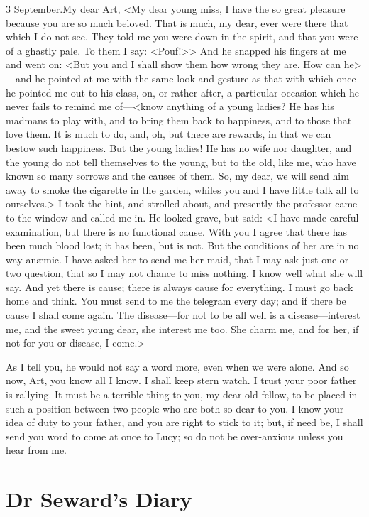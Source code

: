 \begin{mail}{3 September.}{My dear Art,}
<My dear young miss, I have the so great pleasure because you are so much beloved. That is much, my dear, ever were there that which I do not see. They told me you were down in the spirit, and that you were of a ghastly pale. To them I say: <Pouf!>> And he snapped his fingers at me and went on: <But you and I shall show them how wrong they are. How can he>—and he pointed at me with the same look and gesture as that with which once he pointed me out to his class, on, or rather after, a particular occasion which he never fails to remind me of—<know anything of a young ladies? He has his madmans to play with, and to bring them back to happiness, and to those that love them. It is much to do, and, oh, but there are rewards, in that we can bestow such happiness. But the young ladies! He has no wife nor daughter, and the young do not tell themselves to the young, but to the old, like me, who have known so many sorrows and the causes of them. So, my dear, we will send him away to smoke the cigarette in the garden, whiles you and I have little talk all to ourselves.> I took the hint, and strolled about, and presently the professor came to the window and called me in. He looked grave, but said: <I have made careful examination, but there is no functional cause. With you I agree that there has been much blood lost; it has been, but is not. But the conditions of her are in no way anæmic. I have asked her to send me her maid, that I may ask just one or two question, that so I may not chance to miss nothing. I know well what she will say. And yet there is cause; there is always cause for everything. I must go back home and think. You must send to me the telegram every day; and if there be cause I shall come again. The disease—for not to be all well is a disease—interest me, and the sweet young dear, she interest me too. She charm me, and for her, if not for you or disease, I come.>

As I tell you, he would not say a word more, even when we were alone. And so now, Art, you know all I know. I shall keep stern watch. I trust your poor father is rallying. It must be a terrible thing to you, my dear old fellow, to be placed in such a position between two people who are both so dear to you. I know your idea of duty to your father, and you are right to stick to it; but, if need be, I shall send you word to come at once to Lucy; so do not be over-anxious unless you hear from me.

\closeletter{}
\end{mail}

\section{Dr Seward's Diary}

